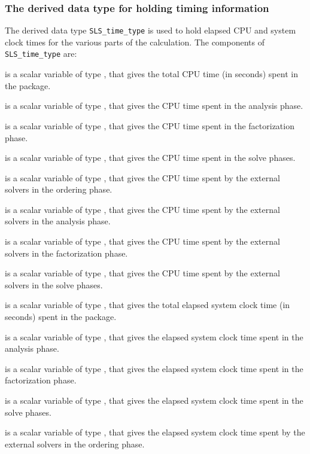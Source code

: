 \documentclass{galahad}
\newcommand{\packagename}{SLS}
\begin{document}
\subsubsection{The derived data type for holding timing
 information}\label{typetime}
The derived data type
{\tt \packagename\_time\_type}
is used to hold elapsed CPU and system clock times for the various parts
of the calculation. The components of
{\tt \packagename\_time\_type}
are:
\begin{description}
 is a scalar variable of type \realdp, that gives
 the total CPU time (in seconds) spent in the package.

 is a scalar variable of type \realdp, that gives
 the CPU time spent in the analysis phase.

 is a scalar variable of type \realdp, that gives
 the CPU time spent in the factorization phase.

 is a scalar variable of type \realdp, that gives
 the CPU time spent in the solve phases.

 is a scalar variable of type \realdp, that gives
 the CPU time spent by the external solvers in the ordering phase.

 is a scalar variable of type \realdp, that gives
 the CPU time spent by the external solvers in the analysis phase.

 is a scalar variable of type \realdp, that gives
 the CPU time spent by the external solvers in the factorization phase.

 is a scalar variable of type \realdp, that gives
 the CPU time spent by the external solvers in the solve phases.

 is a scalar variable of type \realdp, that gives
 the total elapsed system clock time (in seconds) spent in the package.

 is a scalar variable of type \realdp, that gives
 the elapsed system clock time spent in the analysis phase.

 is a scalar variable of type \realdp, that gives
 the elapsed system clock time spent in the factorization phase.

 is a scalar variable of type \realdp, that gives
 the elapsed system clock time spent in the solve phases.

 is a scalar variable of type \realdp,
that gives  the elapsed system clock time spent by the external solvers in the
ordering phase.


\end{description}
\end{document}
